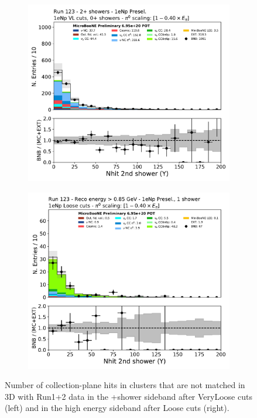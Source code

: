 \begin{figure}[H]
    \begin{center}
    \begin{subfigure}{0.45\textwidth}
    \includegraphics[width=1.00\textwidth]{Sidebands/Figures/CutUpdates/1eNp_2Shr_VL_secondshower_Y_nhit.pdf}
    \end{subfigure}
    \begin{subfigure}{0.45\textwidth}
    \includegraphics[width=1.00\textwidth]{Sidebands/Figures/CutUpdates/1eNp_HE_L_secondshower_Y_nhit.pdf}
    \end{subfigure}
    \caption{\label{fig:sb:cut:secondshowerYnhit} Number of collection-plane hits in clusters that are not matched in 3D with Run1+2 data in the +shower sideband after VeryLoose cuts (left) and in the \npsel high energy sideband after Loose cuts (right).}
    \end{center}
\end{figure}

